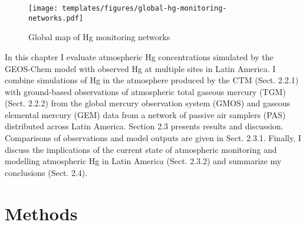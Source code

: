 \begin{figure}[H]
  \texttt{[image: templates/figures/global-hg-monitoring-networks.pdf]}
  \caption{Global map of Hg monitoring networks \cite{united_nations_environment_programme_technical_2019}}
  \label{fig:global-hg-monitoring-networks}
  \centering
  
\end{figure}
\FloatBarrier

\begin{flushleft}
 In this chapter I evaluate atmospheric Hg concentrations simulated by the GEOS-Chem model with observed Hg at multiple sites in Latin America. I combine simulations of Hg in the atmosphere produced by the \gc CTM (Sect. 2.2.1) with ground-based observations of atmospheric total gaseous mercury (TGM) (Sect. 2.2.2) from the global mercury observation system (GMOS) and gaseous elemental mercury (GEM) data from a network of passive air samplers (PAS) distributed across Latin America. Section 2.3 presents results and discussion. Comparisons of observations and model outputs are given in Sect. 2.3.1. Finally, I discuss the implications of the current state of atmospheric monitoring and modelling atmospheric Hg in Latin America (Sect. 2.3.2) and summarize my conclusions (Sect. 2.4).
\end{flushleft}




\section{Methods}
